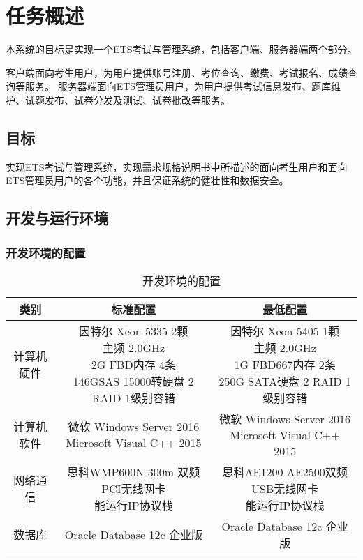 \chapter{任务概述}
本系统的目标是实现一个ETS考试与管理系统，包括客户端、服务器端两个部分。

客户端面向考生用户，为用户提供账号注册、考位查询、缴费、考试报名、成绩查询等服务。
服务器端面向ETS管理员用户，为用户提供考试信息发布、题库维护、试题发布、试卷分发及测试、试卷批改等服务。

\section{目标}
实现ETS考试与管理系统，实现需求规格说明书中所描述的面向考生用户和面向ETS管理员用户的各个功能，并且保证系统的健壮性和数据安全。

\section{开发与运行环境}

\subsection{开发环境的配置}
\begin{table}[htbp]
\centering
\caption{开发环境的配置} \label{tab:development-environment}
\begin{tabular}{|c|c|c|}
    \hline
    类别 & 标准配置 & 最低配置 \\
    \hline
    计算机硬件 & \tabincell{c}{因特尔 Xeon 5335 2颗\\ 主频 2.0GHz\\ 2G FBD内存 4条\\ 146GSAS 15000转硬盘 2 RAID 1级别容错} & \tabincell{c}{因特尔 Xeon 5405 1颗\\ 主频 2.0GHz\\ 1G FBD667内存 2条\\ 250G SATA硬盘 2 RAID 1级别容错} \\
    \hline
    计算机软件 & \tabincell{c}{微软 Windows Server 2016\\ Microsoft Visual C++ 2015} & \tabincell{c}{微软 Windows Server 2016\\ Microsoft Visual C++ 2015} \\
    \hline
    网络通信 & \tabincell{c}{思科WMP600N 300m 双频 PCI无线网卡\\ 能运行IP协议栈} & \tabincell{c}{思科AE1200 AE2500双频USB无线网卡\\ 能运行IP协议栈} \\
    \hline
    数据库 & Oracle Database 12c 企业版 & Oracle Database 12c 企业版 \\
    \hline
\end{tabular}
\end{table}

